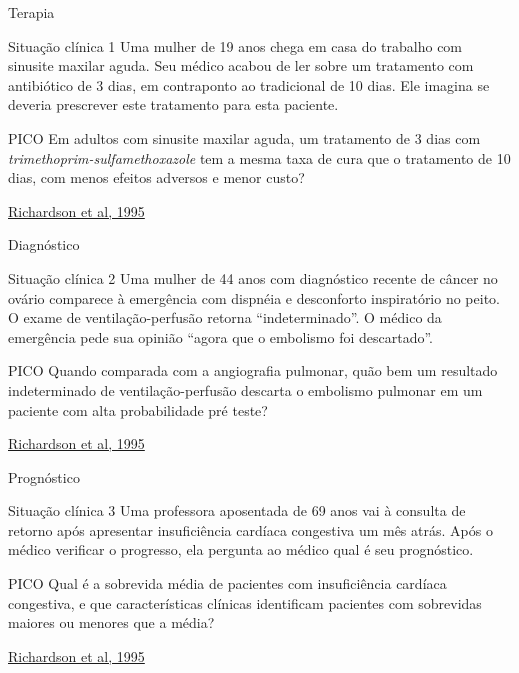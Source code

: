 \documentclass{beamer}
\begin{document}
\begin{frame}{Terapia}
  \begin{exampleblock}{Situação clínica 1}
    \scriptsize
    Uma mulher de 19 anos chega em casa do trabalho com sinusite maxilar aguda.
    Seu médico acabou de ler sobre um tratamento com antibiótico de 3 dias, em contraponto ao tradicional de 10 dias.
    Ele imagina se deveria prescrever este tratamento para esta paciente.
  \end{exampleblock}
  \begin{exampleblock}{PICO}
    Em adultos com sinusite maxilar aguda, um tratamento de 3 dias com {\em trimethoprim-sulfamethoxazole} tem a mesma taxa de cura que o tratamento de 10 dias, com menos efeitos adversos e menor custo?
  \end{exampleblock}
  \vfill
  \scriptsize
  \hfill \href{https://acpjc.acponline.org/Content/123/3/issue/ACPJC-1995-123-3-A12.htm}
      {Richardson et al, 1995}
\end{frame}

\begin{frame}{Diagnóstico}
  \begin{exampleblock}{Situação clínica 2}
    \scriptsize
    Uma mulher de 44 anos com diagnóstico recente de câncer no ovário comparece à emergência com dispnéia e desconforto inspiratório no peito.
    O exame de ventilação-perfusão retorna ``indeterminado''.
    O médico da emergência pede sua opinião ``agora que o embolismo foi descartado''.
  \end{exampleblock}
  \begin{exampleblock}{PICO}
    Quando comparada com a angiografia pulmonar, quão bem um resultado indeterminado de ventilação-perfusão descarta o embolismo pulmonar em um paciente com alta probabilidade pré teste?
  \end{exampleblock}
  \vfill
  \scriptsize
  \hfill \href{https://acpjc.acponline.org/Content/123/3/issue/ACPJC-1995-123-3-A12.htm}
  {Richardson et al, 1995}
\end{frame}

\begin{frame}{Prognóstico}
  \begin{exampleblock}{Situação clínica 3}
    \scriptsize
    Uma professora aposentada de 69 anos vai à consulta de retorno após apresentar insuficiência cardíaca congestiva um mês atrás.
    Após o médico verificar o progresso, ela pergunta ao médico qual é seu prognóstico.
  \end{exampleblock}
  \begin{exampleblock}{PICO}
    Qual é a sobrevida média de pacientes com insuficiência cardíaca congestiva, e que características clínicas identificam pacientes com sobrevidas maiores ou menores que a média?
  \end{exampleblock}
  \vfill
  \scriptsize
  \hfill \href{https://acpjc.acponline.org/Content/123/3/issue/ACPJC-1995-123-3-A12.htm}
  {Richardson et al, 1995}
\end{frame}
\end{document}
